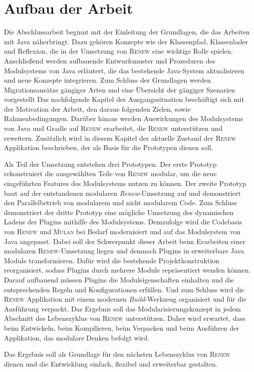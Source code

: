 \section{Aufbau der Arbeit} \label{sec:AdA}
	Die Abschlussarbeit beginnt mit der Einleitung der Grundlagen, die das Arbeiten mit Java näherbringt. Dazu gehören Konzepte wie der Klassenpfad, Klassenlader und Reflexion, die in der Umsetzung von \textsc{Renew} eine wichtige Rolle spielen. Anschließend werden aufbauende Entwurfsmuster und Prozeduren des Modulsystems von Java erläutert, die das bestehende Java-System aktualisieren und neue Konzepte integrieren. Zum Schluss der Grundlagen werden Migrationsansätze gängiger Arten und eine Übersicht der gängiger Szenarien vorgestellt\newline
	Das nachfolgende Kapitel der Ausgangssituation beschäftigt sich mit der Motivation der Arbeit, den daraus folgenden Zielen, sowie Rahmenbedingungen. Darüber hinaus werden Auswirkungen des Modulsystems von Java und Gradle auf \textsc{Renew} erarbeitet, die \textsc{Renew} unterstützen und erweitern. Zusätzlich wird in diesem Kapitel der aktuelle Zustand der \textsc{Renew} Applikation beschrieben, der als Basis für die Prototypen dienen soll. \bigbreak 

	Als Teil der Umsetzung entstehen drei Prototypen. Der erste Prototyp rekonstruiert die ausgewählten Teile von \textsc{Renew} modular, um die neue eingeführten Features des Modulsystems nutzen zu können. Der zweite Prototyp baut auf der entstandenen modularen \textit{Renew}-Umsetzung auf und demonstriert den Parallelbetrieb von modularem und nicht modularem Code. Zum Schluss demonstriert der dritte Prototyp eine mögliche Umsetzung des dynamischen Ladens der Plugins mithilfe des Modulsystems.\newline
	Demzufolge wird die Codebasis von \textsc{Renew} und \textsc{Mulan} bei Bedarf modernisiert und auf das Modulsystem von Java angepasst. Dabei soll der Schwerpunkt dieser Arbeit beim Erarbeiten einer modularen \textsc{Renew}-Umsetzung liegen und demnach Plugins in erweiterbare Java Module transformieren.\newline
	Dafür wird die bestehende Projektkonstruktion reorganisiert, sodass Plugins durch mehrere Module repräsentiert wenden können. Darauf aufbauend müssen Plugins die Moduleigenschaften einhalten und die entsprechenden Regeln und Konfigurationen erfüllen. Und zum Schluss wird die \textsc{Renew} Applikation mit einem modernen \textit{Build}-Werkzeug organisiert und für die Ausführung verpackt.\newline
	Das Ergebnis soll das Modularisierungskonzept in jedem Abschnitt des Lebenszyklus von \textsc{Renew} unterstützen. Daher wird erwartet, dass beim Entwickeln, beim Kompilieren, beim Verpacken und beim Ausführen der Applikation, das modulare Denken befolgt wird. \bigbreak

	Das Ergebnis soll als Grundlage für den nächsten Lebenszyklus von \textsc{Renew} dienen und die Entwicklung einfach, flexibel und erweiterbar gestalten. %
